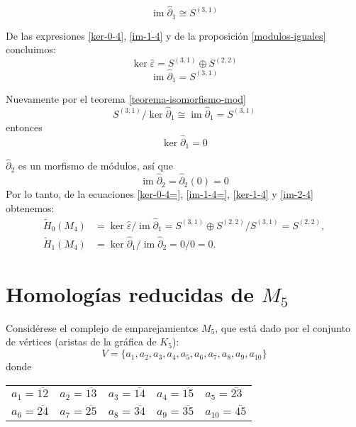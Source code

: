\documentclass[12pt]{book}
\theoremstyle{definition}
\DeclareMathOperator{\im}{im}
\newcounter{in}
\begin{document}
\begin{equation}
\label{im-1-4}
\im\widehat\partial_{1}\cong S^{(3,1)}
\end{equation}

De las expresiones \ref{ker-0-4}, \ref{im-1-4} y de la
proposición \ref{modulos-iguales} concluimos:
\begin{equation}
\label{ker-0-4=}
\ker\widehat\varepsilon=S^{(3,1)}\oplus S^{(2,2)}
\end{equation}
\begin{equation}
\label{im-1-4=}
\im\widehat\partial_{1}=S^{(3,1)}
\end{equation}

Nuevamente por el teorema \ref{teorema-isomorfismo-mod}
$$S^{(3,1)}/\ker\widehat\partial_{1}\cong\im\widehat\partial_{1}= S^{(3,1)} $$
entonces
\begin{equation}
\ker\widehat\partial_{1}=0
\label{ker-1-4}
\end{equation}

$\widehat\partial_{2}$ es un morfismo de módulos, así que
\begin{equation}
\im\widehat\partial_{2}=\widehat\partial_{2}(0)=0
\label{im-2-4}
\end{equation}
Por lo tanto, de la ecuaciones \ref{ker-0-4=}, \ref{im-1-4=},
\ref{ker-1-4} y \ref{im-2-4} obtenemos:
\begin{align*}
\widetilde H_{0}(M_{4})&=\ker \widehat\varepsilon/\im
\widehat\partial_{1}=S^{(3,1)}\oplus S^{(2,2)}/S^{(3,1)}=S^{(2,2)},\\
\widetilde H_{1}(M_{4})&=\ker \widehat\partial_{1}/\im \widehat\partial_{2}=0/0=0.
\end{align*}

\section{Homologías reducidas de $M_{5}$}
\label{hom-red-M5}

Considérese el complejo de emparejamientos $M_{5}$, que
está dado por el conjunto de vértices (aristas de la gráfica de $K_{5}$):
$$V=\{a_{1},a_{2},a_{3},a_{4},a_{5},a_{6},a_{7},a_{8},a_{9},a_{10}\}$$
donde
\begin{table}[!hbtp]
  \centering
  \begin{tabular}{lllll}
    $a_{1}=\overline{12}$ & $a_{2}=\overline{13}$ & $a_{3}=\overline{14}$ & $a_{4}=\overline{15}$ & $a_{5}=\overline{23}$ \\
    $a_{6}=\overline{24}$ & $a_{7}=\overline{25}$ & $a_{8}=\overline{34}$ & $a_{9}=\overline{35}$ & $a_{10}=\overline{45}$
  \end{tabular}
\end{table}
\end{document}
